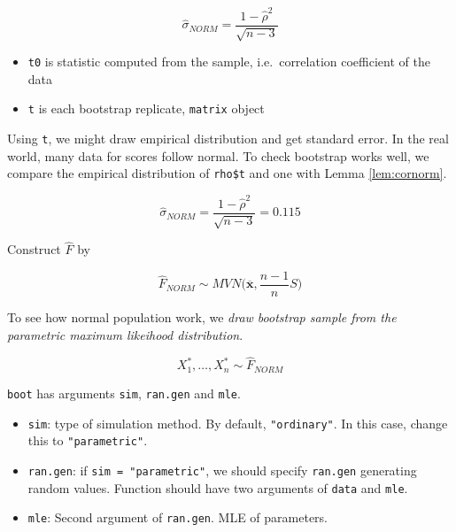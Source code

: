 \documentclass[]{book}
\providecommand{\tightlist}{%
  \setlength{\itemsep}{0pt}\setlength{\parskip}{0pt}}
\theoremstyle{definition}
\theoremstyle{definition}
\theoremstyle{definition}
\theoremstyle{remark}
\begin{document}
\[\hat\sigma_{NORM} = \frac{1 - \hat\rho^2}{\sqrt{n - 3}}\]

\begin{itemize}
\tightlist
\item
  \texttt{t0} is statistic computed from the sample, i.e.~correlation coefficient of the data
\item
  \texttt{t} is each bootstrap replicate, \texttt{matrix} object
\end{itemize}

Using \texttt{t}, we might draw empirical distribution and get standard error. In the real world, many data for scores follow normal. To check bootstrap works well, we compare the empirical distribution of \texttt{rho\$t} and one with Lemma \ref{lem:cornorm}.

\[\hat\sigma_{NORM} = \frac{1 - \hat\rho^2}{\sqrt{n - 3}} = 0.115\]

Construct \(\hat{F}\) by

\[\hat{F}_{NORM} \sim MVN\Big(\overline{\mathbf{x}}, \frac{n-1}{n}S \Big)\]

To see how normal population work, we \emph{draw bootstrap sample from the parametric maximum likeihood distribution}.

\[X_1^{\ast}, \ldots, X_n^{\ast} \sim \hat{F}_{NORM}\]

\texttt{boot} has arguments \texttt{sim}, \texttt{ran.gen} and \texttt{mle}.

\begin{itemize}
\tightlist
\item
  \texttt{sim}: type of simulation method. By default, \texttt{"ordinary"}. In this case, change this to \texttt{"parametric"}.
\item
  \texttt{ran.gen}: if \texttt{sim\ =\ "parametric"}, we should specify \texttt{ran.gen} generating random values. Function should have two arguments of \texttt{data} and \texttt{mle}.
\item
  \texttt{mle}: Second argument of \texttt{ran.gen}. MLE of parameters.
\end{itemize}
\end{document}
